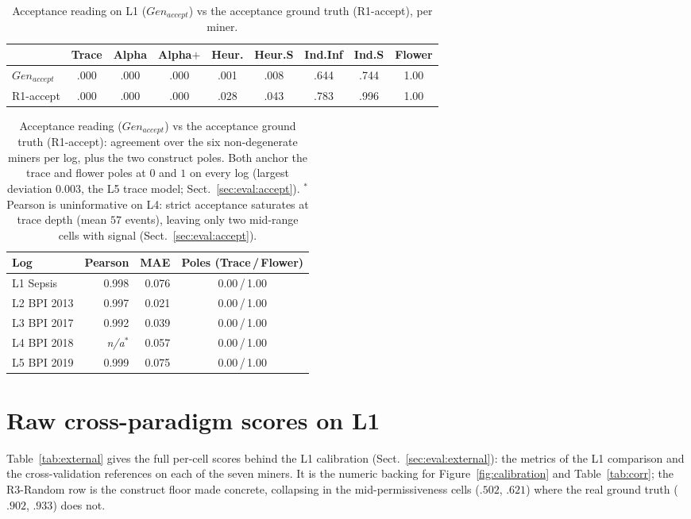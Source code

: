 \documentclass[runningheads]{llncs}
\newcommand{\chg}[1]{#1}
\newcommand{\genaccept}{\ensuremath{\mathit{Gen}_{\mathit{accept}}}}
\begin{document}
\begin{table}[h]
\centering
\caption{Acceptance reading on L1 (\genaccept) vs the acceptance ground truth (R1-accept), per miner.}
\label{tab:accept}
\setlength{\tabcolsep}{3.5pt}
\footnotesize
\begin{tabular}{@{}lcccccccc@{}}
\toprule
 & Trace & Alpha & Alpha$+$ & Heur. & Heur.S & Ind.Inf & Ind.S & Flower \\
\midrule
\genaccept{} & .000 & .000 & .000 & .001 & .008 & .644 & .744 & 1.00 \\
R1-accept & .000 & .000 & .000 & .028 & .043 & .783 & .996 & 1.00 \\
\bottomrule
\end{tabular}
\end{table}

\begin{table}[h]
\centering
\caption{Acceptance reading (\genaccept) vs the acceptance ground truth (R1-accept): agreement over the six non-degenerate miners per log, plus the two construct poles. Both anchor the trace and flower poles at $0$ and $1$ on every log (largest deviation $0.003$, the L5 trace model; Sect.~\ref{sec:eval:accept}). $^{*}$Pearson is uninformative on L4: strict acceptance saturates at trace depth (mean $57$ events), leaving only two mid-range cells with signal (Sect.~\ref{sec:eval:accept}).}
\label{tab:accept-scale}
\setlength{\tabcolsep}{6pt}
\footnotesize
\begin{tabular}{@{}lrrc@{}}
\toprule
Log & Pearson & MAE & Poles (Trace\,/\,Flower) \\
\midrule
L1 Sepsis   & 0.998 & 0.076 & 0.00\,/\,1.00 \\
L2 BPI 2013 & 0.997 & 0.021 & 0.00\,/\,1.00 \\
L3 BPI 2017 & 0.992 & 0.039 & 0.00\,/\,1.00 \\
L4 BPI 2018 & \emph{n/a}$^{*}$ & 0.057 & 0.00\,/\,1.00 \\
L5 BPI 2019 & 0.999 & 0.075 & 0.00\,/\,1.00 \\
\bottomrule
\end{tabular}
\end{table}

\section{Raw cross-paradigm scores on L1}
\label{sec:appendix:external}
\chg{Table~\ref{tab:external} gives the full per-cell scores behind the L1 calibration (Sect.~\ref{sec:eval:external}): the metrics of the L1 comparison and the cross-validation references on each of the seven miners. It is the numeric backing for Figure~\ref{fig:calibration} and Table~\ref{tab:corr}; the R3-Random row is the construct floor made concrete, collapsing in the mid-permissiveness cells ($.502$, $.621$) where the real ground truth ($.902$, $.933$) does not.}
\end{document}
